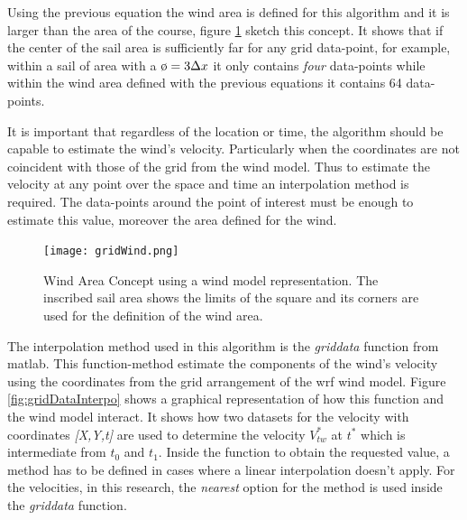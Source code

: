 \par 
Using the previous equation the wind area is defined for this algorithm and it is larger than the area of the course, figure \ref{fig:WindAreaSketch} sketch this concept. It shows that if the center of the sail area is sufficiently far for any grid data-point, for example, within a sail of area with a $\clock = 3 \Delta x$ it only contains \textit{four} data-points while within the wind area defined with the previous equations it contains 64 data-points.\par

It is important that regardless of the location or time, the algorithm should be capable to estimate the wind's velocity. %
Particularly when the coordinates are not coincident with those of the grid from the wind model. Thus to estimate the velocity at any point over the space and time an interpolation method is required. The data-points around the point of interest must be enough to estimate this value, moreover the area defined for the wind.  \par 

\begin{figure} [hbt!]
    \centering
    \texttt{[image: gridWind.png]}
    \caption{Wind Area Concept using a wind model representation. The inscribed sail area shows the limits of the square and its corners are used for the definition of the wind area.}
    \label{fig:WindAreaSketch}
\end{figure}

The interpolation method used in this algorithm is the \textit{griddata} function from \acrshort{matlab}. This function-method estimate the components of the wind's velocity %
using the coordinates from the grid arrangement of the \acrshort{wrf} wind model. Figure \ref{fig:gridDataInterpo} shows a graphical representation of how this function and the wind model interact. It shows how two datasets for the velocity with coordinates \textit{[X,Y,t]} are used to determine the velocity $V_{tw}^{*}$ at $t^{*}$ which is intermediate from $t_{0}$ and $t_{1}$. Inside the function to obtain the requested value, a method has to be defined in cases where a linear interpolation doesn't apply. %
For the velocities, in this research, the \textit{nearest} option for the method is used inside the \textit{griddata} function.\par

